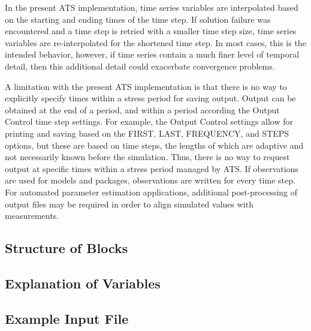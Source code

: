 In the present ATS implementation, time series variables are interpolated based on the starting and ending times of the time step.  If solution failure was encountered and a time step is retried with a smaller time step size, time series variables are re-interpolated for the shortened time step.  In most cases, this is the intended behavior, however, if time series contain a much finer level of temporal detail, then this additional detail could exacerbate convergence problems.

A limitation with the present ATS implementation is that there is no way to explicitly specify times within a stress period for saving output.  Output can be obtained at the end of a period, and within a period according the Output Control time step settings.  For example, the Output Control settings allow for printing and saving based on the FIRST, LAST, FREQUENCY, and STEPS options, but these are based on time steps, the lengths of which are adaptive and not necessarily known before the simulation.  Thus, there is no way to request output at specific times within a stress period managed by ATS.  If observations are used for models and packages, observations are written for every time step.  For automated parameter estimation applications, additional post-processing of output files may be required in order to align simulated values with measurements.  

\vspace{5mm}
\subsection{Structure of Blocks}
%



\vspace{5mm}
\subsection{Explanation of Variables}
\begin{description}

\end{description}

\vspace{5mm}
\subsection{Example Input File}


